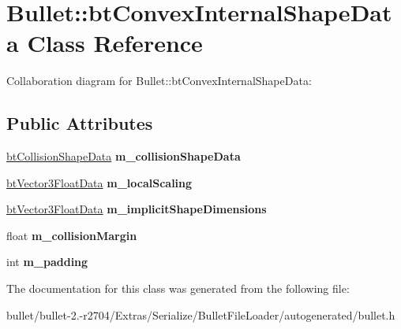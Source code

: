 \hypertarget{class_bullet_1_1bt_convex_internal_shape_data}{\section{Bullet\+:\+:bt\+Convex\+Internal\+Shape\+Data Class Reference}
\label{class_bullet_1_1bt_convex_internal_shape_data}
}


Collaboration diagram for Bullet\+:\+:bt\+Convex\+Internal\+Shape\+Data\+:
\subsection*{Public Attributes}
\begin{DoxyCompactItemize}
\item 
\hypertarget{class_bullet_1_1bt_convex_internal_shape_data_a0b7e976f9e7a4fc576ab6d5606ef5afd}{\hyperlink{class_bullet_1_1bt_collision_shape_data}{bt\+Collision\+Shape\+Data} {\bfseries m\+\_\+collision\+Shape\+Data}}\label{class_bullet_1_1bt_convex_internal_shape_data_a0b7e976f9e7a4fc576ab6d5606ef5afd}

\item 
\hypertarget{class_bullet_1_1bt_convex_internal_shape_data_aad333406132dab398faf8f58f2f00ebc}{\hyperlink{class_bullet_1_1bt_vector3_float_data}{bt\+Vector3\+Float\+Data} {\bfseries m\+\_\+local\+Scaling}}\label{class_bullet_1_1bt_convex_internal_shape_data_aad333406132dab398faf8f58f2f00ebc}

\item 
\hypertarget{class_bullet_1_1bt_convex_internal_shape_data_aac94966c7fad00244ee3934619ffdd7e}{\hyperlink{class_bullet_1_1bt_vector3_float_data}{bt\+Vector3\+Float\+Data} {\bfseries m\+\_\+implicit\+Shape\+Dimensions}}\label{class_bullet_1_1bt_convex_internal_shape_data_aac94966c7fad00244ee3934619ffdd7e}

\item 
\hypertarget{class_bullet_1_1bt_convex_internal_shape_data_a0c60d1de5b3e199b4d0ab51e25b69993}{float {\bfseries m\+\_\+collision\+Margin}}\label{class_bullet_1_1bt_convex_internal_shape_data_a0c60d1de5b3e199b4d0ab51e25b69993}

\item 
\hypertarget{class_bullet_1_1bt_convex_internal_shape_data_a13c8ecdc673ae14e84c2b50a7f7b9062}{int {\bfseries m\+\_\+padding}}\label{class_bullet_1_1bt_convex_internal_shape_data_a13c8ecdc673ae14e84c2b50a7f7b9062}

\end{DoxyCompactItemize}


The documentation for this class was generated from the following file\+:\begin{DoxyCompactItemize}
\item 
bullet/bullet-\/2.-\/r2704/\+Extras/\+Serialize/\+Bullet\+File\+Loader/autogenerated/bullet.\+h\end{DoxyCompactItemize}
